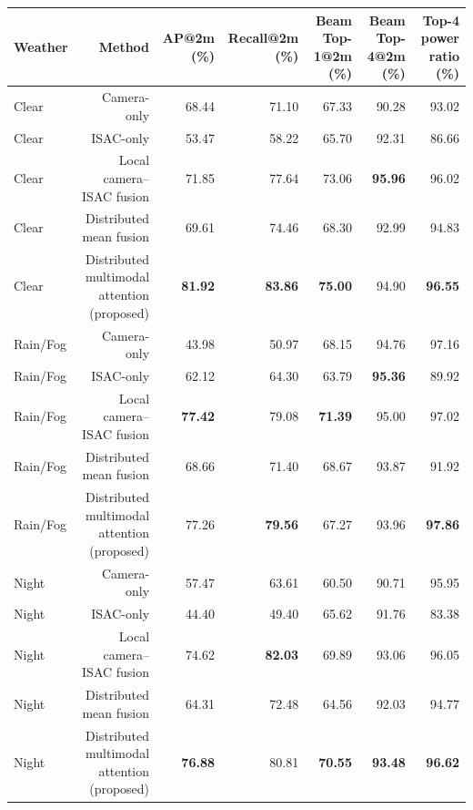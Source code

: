 \begin{tabular}{lrrrrrr}
\toprule
Weather & Method & AP@2m (\%) & Recall@2m (\%) & Beam Top-1@2m (\%) & Beam Top-4@2m (\%) & Top-4 power ratio (\%) \\
\midrule
Clear & Camera-only & 68.44 & 71.10 & 67.33 & 90.28 & 93.02 \\
Clear & ISAC-only & 53.47 & 58.22 & 65.70 & 92.31 & 86.66 \\
Clear & Local camera--ISAC fusion & 71.85 & 77.64 & 73.06 & \textbf{95.96} & 96.02 \\
Clear & Distributed mean fusion & 69.61 & 74.46 & 68.30 & 92.99 & 94.83 \\
Clear & Distributed multimodal attention (proposed) & \textbf{81.92} & \textbf{83.86} & \textbf{75.00} & 94.90 & \textbf{96.55} \\
Rain/Fog & Camera-only & 43.98 & 50.97 & 68.15 & 94.76 & 97.16 \\
Rain/Fog & ISAC-only & 62.12 & 64.30 & 63.79 & \textbf{95.36} & 89.92 \\
Rain/Fog & Local camera--ISAC fusion & \textbf{77.42} & 79.08 & \textbf{71.39} & 95.00 & 97.02 \\
Rain/Fog & Distributed mean fusion & 68.66 & 71.40 & 68.67 & 93.87 & 91.92 \\
Rain/Fog & Distributed multimodal attention (proposed) & 77.26 & \textbf{79.56} & 67.27 & 93.96 & \textbf{97.86} \\
Night & Camera-only & 57.47 & 63.61 & 60.50 & 90.71 & 95.95 \\
Night & ISAC-only & 44.40 & 49.40 & 65.62 & 91.76 & 83.38 \\
Night & Local camera--ISAC fusion & 74.62 & \textbf{82.03} & 69.89 & 93.06 & 96.05 \\
Night & Distributed mean fusion & 64.31 & 72.48 & 64.56 & 92.03 & 94.77 \\
Night & Distributed multimodal attention (proposed) & \textbf{76.88} & 80.81 & \textbf{70.55} & \textbf{93.48} & \textbf{96.62} \\
\bottomrule
\end{tabular}
